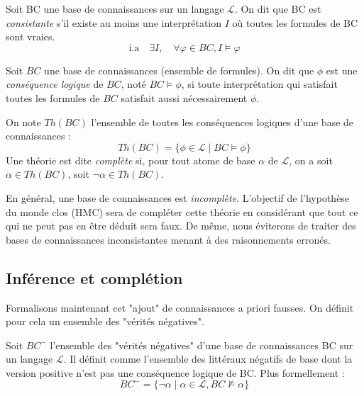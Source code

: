 \begin{definition}[Consistance]
    Soit BC une base de connaissances sur un langage $ \mathcal{L}$. On dit que BC est 
    \emph{consistante} s'il existe au moins une interprétation $I$ où toutes les formules de BC sont vraies. 
        $$ \text{i.a} \quad \exists I, \quad \forall \varphi \in BC, I \models \varphi $$  
\end{definition}

\begin{definition}
    Soit $BC$ une base de connaissances (ensemble de formules). On dit que $\phi$ est une \emph{conséquence logique} 
    de $BC$, noté \boldmath$BC \models \phi$\unboldmath, si toute interprétation qui satisfait toutes les 
    formules de $BC$ satisfait aussi nécessairement $\phi$.
\end{definition}

\begin{definition}[Théorie]
    On note $Th(BC)$ l'ensemble de toutes les conséquences logiques d'une base de connaissances :
    \begin{equation}
        Th(BC) = \{ \phi \in \mathcal{L} \mid BC \models \phi \}
    \end{equation} 
    Une théorie est dite \emph{complète} si, pour tout atome de base $\alpha$ de $ \mathcal{L}$, on a soit $\alpha \in Th(BC)$, 
    soit $\neg \alpha \in Th(BC)$.
\end{definition}

En général, une base de connaissances est \emph{incomplète}. L'objectif de l'hypothèse du monde clos (HMC)
sera de compléter cette théorie en considérant que tout ce qui ne peut pas en être déduit sera faux. 
De même, nous éviterons de traiter des bases de connaissances inconsistantes menant à des raisonnements erronés.

\subsection{Inférence et complétion}

Formalisons maintenant cet "ajout" de connaissances a priori fausses. On définit pour cela 
un ensemble des "vérités négatives". 

\begin{definition}[$BC^-$]
    Soit $ BC^-$ l'ensemble des "vérités négatives" d'une base de connaissances BC sur un langage $ \mathcal{L}$. 
    Il définit comme l'ensemble des littéraux négatifs de base dont la version positive n'est pas une conséquence logique de 
    BC. Plus formellement : 
    \begin{equation}
        \boxed{BC^- = \{ \lnot \alpha \mid \alpha \in \mathcal{L}, BC \nvDash \alpha\}}
    \end{equation}
\end{definition}

